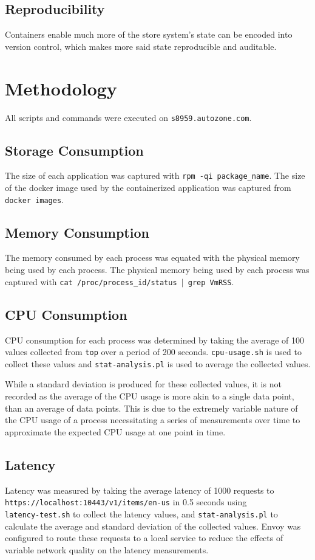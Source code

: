\documentclass{article}
\begin{document}
\subsection{Reproducibility}
Containers enable much more of the store system's state can be encoded into version control, which makes more said state reproducible and auditable.

\section{Methodology}
All scripts and commands were executed on \texttt{s8959.autozone.com}.

\subsection{Storage Consumption}
The size of each application was captured with \texttt{rpm -qi package\_name}. The size of the docker image used by the containerized application was captured from \texttt{docker images}.

\subsection{Memory Consumption}
The memory consumed by each process was equated with the physical memory being used by each process. The physical memory being used by each process was captured with \texttt{cat /proc/process\_id/status $|$ grep VmRSS}.

\subsection{CPU Consumption}
CPU consumption for each process was determined by taking the average of 100 values collected from \texttt{top} over a period of 200 seconds. \texttt{cpu-usage.sh} is used to collect these values and \texttt{stat-analysis.pl} is used to average the collected values.

While a standard deviation is produced for these collected values, it is not recorded as the average of the CPU usage is more akin to a single data point, than an average of data points. This is due to the extremely variable nature of the CPU usage of a process necessitating a series of measurements over time to approximate the expected CPU usage at one point in time.

\subsection{Latency}
Latency was measured by taking the average latency of 1000 requests to\\
\texttt{https://localhost:10443/v1/items/en-us} in 0.5 seconds using\\
\texttt{latency-test.sh} to collect the latency values, and \texttt{stat-analysis.pl} to calculate the average and standard deviation of the collected values. Envoy was configured to route these requests to a local service to reduce the effects of variable network quality on the latency measurements.
\end{document}
